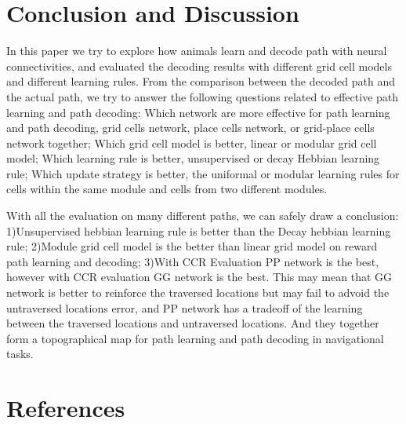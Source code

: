\documentclass[11pt, letterpaper, onecolumn]{article}
\begin{document}
\section{Conclusion and Discussion}
In this paper we try to explore how animals learn and decode path with neural connectivities, and evaluated the decoding results with different grid cell models and different learning rules. From the comparison between the decoded path and the actual path, we try to answer the following questions related to effective path learning and path decoding: Which network are more effective for path learning and path decoding, grid cells network, place cells network, or grid-place cells network together; Which grid cell model is better, linear or modular grid cell model; Which learning rule is better, unsupervised or decay Hebbian learning rule; Which update strategy is better, the uniformal or modular learning rules for cells within the same module and cells from two different modules. 

With all the evaluation on many different paths, we can safely draw a conclusion: 1)Unsupervised hebbian learning rule is better than the Decay hebbian learning rule; 2)Module grid cell model is the better than linear grid model on reward path learning and decoding; 3)With CCR Evaluation PP network is the best, however with CCR evaluation GG network is the best. This may mean that GG network is better to reinforce the traversed locations but may fail to advoid the untraversed locations error, and PP network has a tradeoff of the learning between the traversed locations and untraversed locations. And they together form a topographical map for path learning and path decoding in navigational tasks.

\newpage
\section{References}



\end{document}
